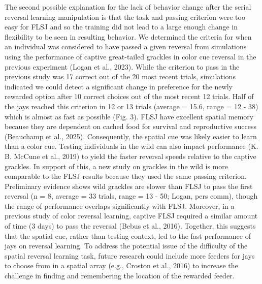 \documentclass[
]{article}
\begin{document}
The second possible explanation for the lack of behavior change after
the serial reversal learning manipulation is that the task and passing
criterion were too easy for FLSJ and so the training did not lead to a
large enough change in flexibility to be seen in resulting behavior. We
determined the criteria for when an individual was considered to have
passed a given reversal from simulations using the performance of
captive great-tailed grackles in color cue reversal in the previous
experiment (Logan et al., 2023). While the criterion to pass in the
previous study was 17 correct out of the 20 most recent trials,
simulations indicated we could detect a significant change in preference
for the newly rewarded option after 10 correct choices out of the most
recent 12 trials. Half of the jays reached this criterion in 12 or 13
trials (average = 15.6, range = 12 - 38) which is almost as fast as
possible (Fig. 3). FLSJ have excellent spatial memory because they are
dependent on cached food for survival and reproductive success
(Beauchamp et al., 2025). Consequently, the spatial cue was likely
easier to learn than a color cue. Testing individuals in the wild can
also impact performance (K. B. McCune et al., 2019) to yield the faster
reversal speeds relative to the captive grackles. In support of this, a
new study on grackles in the wild is more comparable to the FLSJ results
because they used the same passing criterion. Preliminary evidence shows
wild grackles are slower than FLSJ to pass the first reversal (n = 8,
average = 33 trials, range = 13 - 50; Logan, pers comm), though the
range of performance overlaps significantly with FLSJ. Moreover, in a
previous study of color reversal learning, captive FLSJ required a
similar amount of time (3 days) to pass the reversal (Bebus et al.,
2016). Together, this suggests that the spatial cue, rather than testing
context, led to the fast performance of jays on reversal learning. To
address the potential issue of the difficulty of the spatial reversal
learning task, future research could include more feeders for jays to
choose from in a spatial array (e.g., Croston et al., 2016) to increase
the challenge in finding and remembering the location of the rewarded
feeder.
\end{document}
